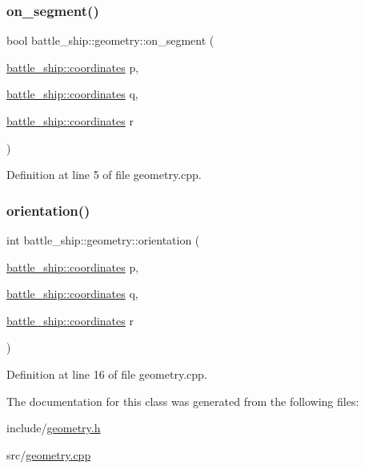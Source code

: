 \subsubsection{\texorpdfstring{on\+\_\+segment()}{on\_segment()}}
{\footnotesize\ttfamily bool battle\+\_\+ship\+::geometry\+::on\+\_\+segment (\begin{DoxyParamCaption}\item[{\hyperlink{structbattle__ship_1_1coordinates}{battle\+\_\+ship\+::coordinates}}]{p,  }\item[{\hyperlink{structbattle__ship_1_1coordinates}{battle\+\_\+ship\+::coordinates}}]{q,  }\item[{\hyperlink{structbattle__ship_1_1coordinates}{battle\+\_\+ship\+::coordinates}}]{r }\end{DoxyParamCaption})\hspace{0.3cm}{\ttfamily [static]}}



Definition at line 5 of file geometry.\+cpp.

\mbox{\label{classbattle__ship_1_1geometry_a319941076b65116cfb1ab1f636fb9b20}} 
\subsubsection{\texorpdfstring{orientation()}{orientation()}}
{\footnotesize\ttfamily int battle\+\_\+ship\+::geometry\+::orientation (\begin{DoxyParamCaption}\item[{\hyperlink{structbattle__ship_1_1coordinates}{battle\+\_\+ship\+::coordinates}}]{p,  }\item[{\hyperlink{structbattle__ship_1_1coordinates}{battle\+\_\+ship\+::coordinates}}]{q,  }\item[{\hyperlink{structbattle__ship_1_1coordinates}{battle\+\_\+ship\+::coordinates}}]{r }\end{DoxyParamCaption})\hspace{0.3cm}{\ttfamily [static]}}



Definition at line 16 of file geometry.\+cpp.



The documentation for this class was generated from the following files\+:\begin{DoxyCompactItemize}
\item 
include/\hyperlink{geometry_8h}{geometry.\+h}\item 
src/\hyperlink{geometry_8cpp}{geometry.\+cpp}\end{DoxyCompactItemize}
